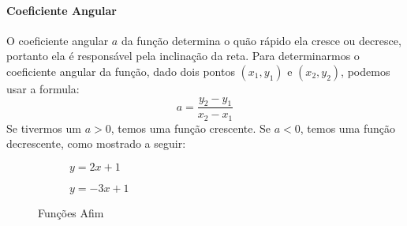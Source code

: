 \paragraph{Coeficiente Angular} O coeficiente angular $a$ da função determina o quão rápido ela cresce ou decresce, portanto ela é responsável pela inclinação da reta. Para determinarmos o coeficiente angular da função, dado dois pontos $(x_1,y_1)$ e $(x_2,y_2)$, podemos usar a formula:\[a=\frac{y_2-y_1}{x_2-x_1}\]
Se tivermos um $a>0$, temos uma função crescente. Se $a<0$, temos uma função decrescente, como mostrado a seguir: 

\begin{figure}[H]
\centering
	\begin{subfigure}[b]{0.35\linewidth}
	\centering
	\caption{$y=2x+1$}
	\end{subfigure}
	\qquad
	\begin{subfigure}[b]{0.35\textwidth}
	\centering
	\caption{$y=-3x+1$}
	\end{subfigure}
\caption{Funções Afim}
\end{figure}

